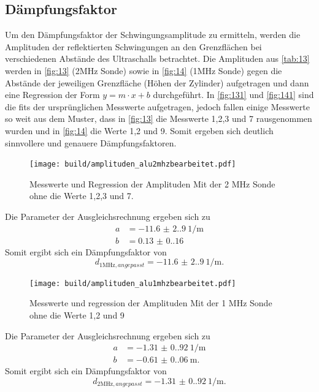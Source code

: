 \subsection{Dämpfungsfaktor}
Um den Dämpfungsfaktor der Schwingungsamplitude zu ermitteln, werden die
Amplituden der reflektierten Schwingungen an den Grenzflächen bei verschiedenen
Abstände des Ultraschalls betrachtet. Die Amplituden aus \autoref{tab:13} werden
in \autoref{fig:13} (2$\unit{\mega\hertz}$ Sonde) sowie in \autoref{fig:14} 
(1$\unit{\mega\hertz}$ Sonde) gegen die Abstände der jeweiligen Grenzfläche 
(Höhen der Zylinder) aufgetragen und dann eine Regression der Form 
$y = m \cdot x + b$  durchgeführt. In \autoref{fig:131} und \autoref{fig:141} sind
die fits der ursprünglichen Messwerte aufgetragen, jedoch fallen einige
Messwerte so weit aus dem Muster, dass in \autoref{fig:13} die Messwerte 
1,2,3 und 7 rausgenommen wurden und in \autoref{fig:14} die Werte 1,2 und 9.
Somit ergeben sich deutlich sinnvollere und genauere Dämpfungsfaktoren.
 
\begin{figure}[H]
    \centering
    \caption{Messwerte und Regression der Amplituden Mit der 2 $\unit{\mega\hertz}$ Sonde ohne die Werte 1,2,3 und 7.}
    \label{fig:13}
    \texttt{[image: build/amplituden\_alu2mhzbearbeitet.pdf]}
\end{figure}
Die Parameter der Ausgleichsrechnung ergeben sich zu 
\begin{align*}
    a &= \qty{-11.6(2.9)}{1 \per\meter}\\
    b &= \qty{0.13(0.16)}{}
\end{align*}
Somit ergibt sich ein Dämpfungsfaktor von 
\begin{equation}
    d_{1\unit{\mega\hertz},angepasst} = \qty{-11.6(2.9)}{1 \per\meter}.
\end{equation}

\begin{figure}[H]
    \centering
    \caption{Messwerte und regression der Amplituden Mit der 1 $\unit{\mega\hertz}$ Sonde ohne die Werte 1,2 und 9}
    \label{fig:14}
    \texttt{[image: build/amplituden\_alu1mhzbearbeitet.pdf]}
\end{figure}
\noindent Die Parameter der Ausgleichsrechnung ergeben sich zu 
\begin{align*}
    a &= \qty{-1.31(0.92)}{1 \per\meter}\\
    b &= \qty{-0.61(0.06)}{\meter}.
\end{align*}
Somit ergibt sich ein Dämpfungsfaktor von 
\begin{equation}
    d_{2 \unit{\mega\hertz},angepasst} = \qty{-1.31(0.92)}{1 \per\meter}.
\end{equation}

